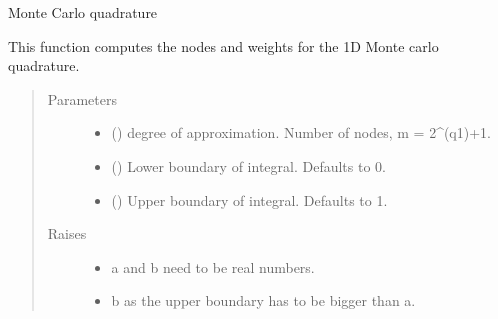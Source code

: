 \documentclass[letterpaper,10pt,english]{sphinxmanual}
\begin{document}

\begin{fulllineitems}
\label{\detokenize{index:Studienprojekt_Smolyak_qmc_one_point.monte_carlo_quad}}
Monte Carlo quadrature

This function computes the nodes and weights for the 1D Monte carlo quadrature.
\begin{quote}\begin{description}
\item[{Parameters}] \leavevmode\begin{itemize}
\item {} 
 () \textendash{} degree of approximation. Number of nodes, m = 2\textasciicircum{}(q\sphinxhyphen{}1)+1.

\item {} 
 (\sphinxstyleliteralemphasis{\sphinxupquote{, }}) \textendash{} Lower boundary of integral. Defaults to 0.

\item {} 
 (\sphinxstyleliteralemphasis{\sphinxupquote{, }}) \textendash{} Upper boundary of integral. Defaults to 1.

\end{itemize}

\item[{Raises}] \leavevmode\begin{itemize}
\item {} 
 \textendash{} a and b need to be real numbers.

\item {} 
 \textendash{} b as the upper boundary has to be bigger than a.


\end{itemize}
\end{description}
\end{quote}
\end{fulllineitems}
\end{document}
